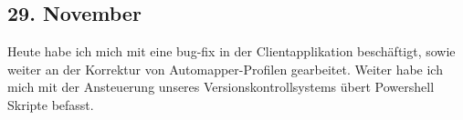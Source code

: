 \subsection{29. November}
Heute habe ich mich mit eine bug-fix in der Clientapplikation beschäftigt, sowie weiter an der Korrektur von Automapper-Profilen gearbeitet. Weiter habe ich mich mit der Ansteuerung unseres Versionskontrollsystems übert Powershell Skripte befasst.
